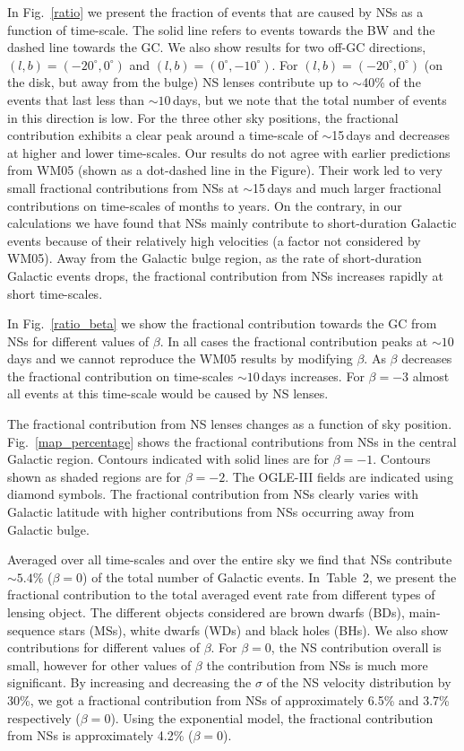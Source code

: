 \documentclass[iop,apj]{emulateapj}
\begin{document}
In Fig.~\ref{ratio} we present the fraction of events that are caused by NSs as a 
function of time-scale. The solid line refers to events towards the BW and the dashed line 
towards the GC. We also show results for two off-GC directions, $(l,b)=(-20^{\circ},0^{\circ})$ 
and $(l,b)=(0^{\circ},-10^{\circ})$. For $(l,b)=(-20^{\circ},0^{\circ})$ (on the disk, but 
away from the bulge) NS lenses contribute up to $\sim$40\% of the events that last less 
than $\sim10$\,days, but we note that the total number of events in this direction is low. 
For the three other sky positions, the fractional contribution exhibits a clear peak around 
a time-scale of $\sim$15\,days and decreases at higher and lower time-scales. Our results 
do not agree with earlier predictions from WM05 (shown as a dot-dashed line in the Figure). 
Their work led to very small fractional contributions from NSs at
$\sim$15\,days and much larger fractional contributions on time-scales
of months to years.
%
On the contrary, in our calculations we have found that NSs mainly
contribute to short-duration Galactic events because of their
relatively high velocities (a factor not considered by WM05).
Away from the Galactic bulge region, as the rate of short-duration
Galactic events drops, the fractional contribution from NSs increases
rapidly at short time-scales.

In Fig.~\ref{ratio_beta} we show the fractional contribution towards the GC from NSs for 
different values of $\beta$. In all cases the fractional contribution peaks at $\sim 10$\,days 
and we cannot reproduce the WM05 results by modifying $\beta$. As $\beta$ decreases the 
fractional contribution on time-scales $\sim 10$\,days increases. For $\beta = -3$ almost 
all events at this time-scale would be caused by NS lenses. 

The fractional contribution from NS lenses changes as a function of sky position. Fig.~\ref{map_percentage} 
shows the fractional contributions from NSs in the central Galactic region. Contours indicated with 
solid lines are for $\beta = -1$. Contours shown as shaded regions are for $\beta = -2$. The OGLE-III 
fields are indicated using diamond symbols. The fractional contribution from NSs clearly varies 
with Galactic latitude with higher contributions from NSs occurring away from Galactic bulge. 
%

Averaged over all time-scales and over the entire sky we find that NSs contribute $\sim 5.4\%$ ($\beta = 0$) 
of the total number of Galactic events. In~Table~2, we present the fractional contribution to the total 
averaged event rate from different types of lensing object. The different objects considered are brown 
dwarfs (BDs), main-sequence stars (MSs), white dwarfs (WDs) and black holes (BHs). We also show  
contributions for different values of $\beta$. For $\beta = 0$, the NS contribution overall 
is small, however for other values of $\beta$ the contribution from NSs is much more significant.
%
By increasing and decreasing the $\sigma$ of the NS velocity distribution by 30\%, we 
got a fractional contribution from NSs of approximately 6.5\% and 3.7\% respectively ($\beta=0$).
Using the exponential	model, the fractional contribution from NSs is approximately 4.2\% ($\beta=0$).
\end{document}
